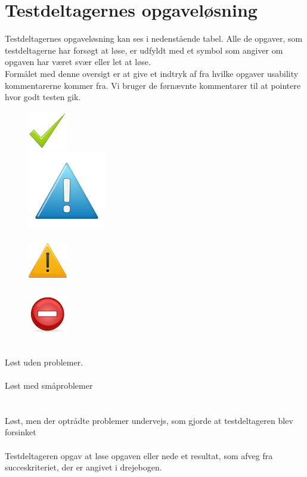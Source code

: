 \documentclass[12pt]{article}
\begin{document}
\section{Testdeltagernes opgaveløsning}
Testdeltagernes opgaveløsning kan ses i nedenstående tabel. Alle de opgaver, som testdeltagerne har forsøgt at løse, er udfyldt med et symbol som angiver om opgaven har været svær eller let at løse. \\
\noindent Formålet med denne oversigt er at give et indtryk af fra hvilke opgaver usability kommentarerne kommer fra.
Vi bruger de førnævnte kommentarer til at pointere hvor godt testen gik.\\
 \begin{figure}
  \includegraphics[scale=0.4]{Billeder/godt} \\
  \includegraphics[scale=0.3]{Billeder/mindre}  \\ \\
  \includegraphics[scale=0.5]{Billeder/alvorligt}  \\ \\
    \includegraphics[scale=0.6]{Billeder/kritisk}
\end{figure}\\ 
Løst uden problemer.\\ \\
Løst med småproblemer \\ \\ \\
Løst, men der optrådte problemer undervejs, som gjorde at testdeltageren blev forsinket \\ \\
Testdeltageren opgav at løse opgaven eller nede et resultat, som afveg fra succeskriteriet, der er angivet i drejebogen. \\
\end{document}
